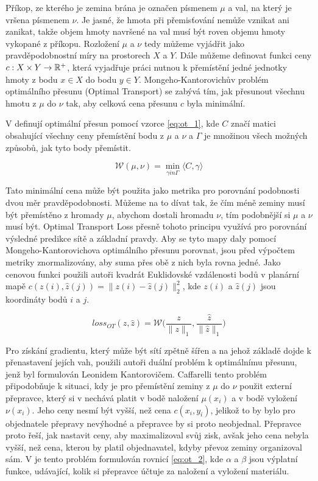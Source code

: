 Příkop, ze kterého je zemina brána je označen písmenem \(\mu\) a val, na který je vršena písmenem \(\nu\).
Je jasné, že hmota při přemisťování nemůže vznikat ani zanikat, takže objem hmoty navršené na val musí být roven objemu hmoty vykopané z příkopu. 
Rozložení \(\mu\) a \(\nu\) tedy můžeme vyjádřit jako pravděpodobnostní míry na prostorech \(X\) a \(Y\).
Dále můžeme definovat funkci ceny \(c : X \times Y  \rightarrow \mathbb{R}^+ \), která vyjadřuje práci nutnou k přemístění jedné jednotky hmoty z bodu \(x \in X\) do bodu \(y \in Y\).
Mongeho-Kantorovichův problém optimálního přesunu (Optimal Transport) se zabývá tím, jak přesunout všechnu hmotu z \(\mu\) do \(\nu\) tak, aby celková cena přesunu \(c\) byla minimální.

V \cite{DM_Count} definují optimální přesun pomocí vzorce \ref{eq:ot_1}, kde \(C\) značí matici obsahující všechny ceny přemístění bodu z \(\mu\) a \(\nu\) a \(\Gamma\) je množinou všech možných způsobů, jak tyto body přemístit.

\begin{equation}
\mathcal{W}(\mu, \nu) = \min_{\gamma in \Gamma} \langle C, \gamma \rangle
\label{eq:ot_1}
\end{equation}

Tato minimální cena může být použita jako metrika pro porovnání podobnosti dvou měr pravděpodobnosti.
Můžeme na to dívat tak, že čím méně zeminy musí být přemístěno z hromady \(\mu\), abychom dostali hromadu \(\nu\), tím podobnější si \(\mu\) a \(\nu\) musí být.
Optimal Transport Loss přesně tohoto principu využívá pro porovnání výsledné predikce sítě a 
základní pravdy.
Aby se tyto mapy daly pomocí Mongeho-Kantorovichova optimálního přesunu porovnat, jsou před výpočtem metriky znormalizovány, aby suma přes obě z nich byla rovna jedné.
Jako cenovou funkci použili autoři \cite{DM_Count} kvadrát Euklidovské vzdálenosti bodů v planární mapě \(c(z(i), \hat{z}(j)) = \|z(i) - \hat{z}(j)\|_2^2\), kde \(z(i)\) a \(\hat{z}(j)\) jsou koordináty bodů \(i\) a \(j\).

\begin{equation}
loss_{OT}(z, \hat{z}) = \mathcal{W}\bigg(\frac{z}{\|z\|_1}, \frac{\hat{z}}{\|\hat{z}\|_1}\bigg) 
\label{eq:ot_loss}
\end{equation}

Pro získání gradientu, který může být sítí zpětně šířen a na jehož základě dojde k přenastavení jejích vah, použili autoři duální problém k optimálnímu přesunu, jenž byl formulován Leonidem Kantorovičem.
Caffarelli \cite{Caffarelli_dual_problem} tento problém připodobňuje k situaci, kdy je pro přemístění zeminy z \(\mu\) do \(\nu\) použit externí přepravce, který si v nechává platit v bodě naložení \(\mu(x_i)\) a v bodě vyložení \(\nu(x_i)\).
Jeho ceny nesmí být vyšší, než cena \(c(x_i, y_i)\), jelikož to by bylo pro objednatele přepravy nevýhodné a přepravce by si proto neobjednal.
Přepravce proto řeší, jak nastavit ceny, aby maximalizoval svůj zisk, avšak jeho cena nebyla vyšší, než cena, kterou by platil objednavatel, kdyby převoz zeminy organizoval sám.
V \cite{DM_Count} je tento problém formulován rovnicí \ref{eq:ot_2}, kde \(\alpha\) a \(\beta\) jsou výplatní funkce, udávající, kolik si přepravce účtuje za naložení a vyložení materiálu.

